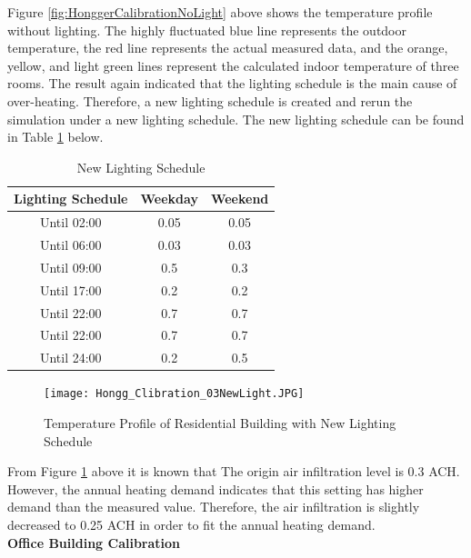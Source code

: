 			Figure \ref{fig:HonggerCalibrationNoLight} above shows the temperature profile without lighting. The highly fluctuated blue line represents the outdoor temperature, the red line represents the actual measured data, and the orange, yellow, and light green lines represent  the calculated indoor temperature of three rooms. The result again indicated that the lighting schedule is the main cause of over-heating. Therefore, a new lighting schedule is created and rerun the simulation under a new lighting schedule. The new lighting schedule can be found in Table \ref{tab:HonggLightingCtrl} below.
			
        	\begin{table}[htbp]
        	\centering
        	\caption{New Lighting Schedule}
        	    \begin{tabular}{ccc}
        	    \toprule
        	    Lighting Schedule & Weekday & Weekend\\
        	    \midrule
                Until 02:00 & 0.05 & 0.05 \\
                Until 06:00 & 0.03 & 0.03\\
                Until 09:00 & 0.5 & 0.3\\
                Until 17:00 & 0.2 & 0.2\\
                Until 22:00 & 0.7 & 0.7\\
                Until 22:00 & 0.7 & 0.7\\
                Until 24:00 & 0.2 & 0.5\\
        	    \bottomrule
        	    \end{tabular}%
        	  \label{tab:HonggLightingCtrl}%
        	\end{table}%
			
			
			\begin{figure}[H]
			\centering
			\texttt{[image: Hongg\_Clibration\_03NewLight.JPG]}
			\caption{Temperature Profile of Residential Building with New Lighting Schedule}
			\label{fig:HonggerCalibrationNewLight}
			\end{figure}
			
			From Figure \ref{fig:HonggerCalibrationNewLight} above it is known that
			The origin air infiltration level is 0.3 ACH. However, the annual heating demand indicates that this setting has higher demand than the measured value. Therefore, the air infiltration is slightly decreased to 0.25 ACH in order to fit the annual heating demand.\\ 

			\textbf{Office Building Calibration}\\

